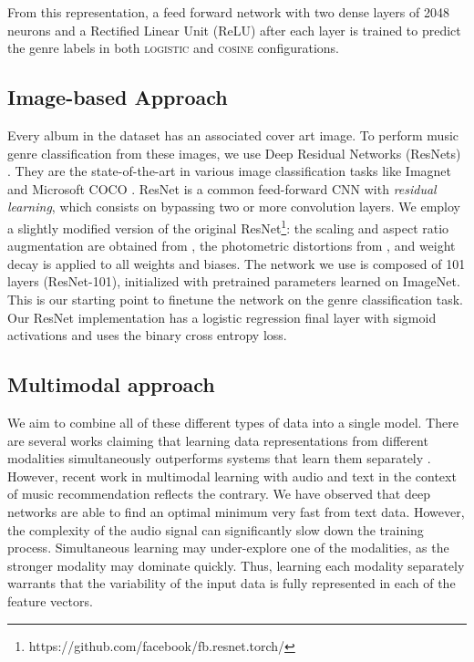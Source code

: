 \documentclass{article}
\begin{document}
From this representation, a feed forward network with two dense layers of 2048 neurons and a Rectified Linear Unit (ReLU) after each layer is trained to predict the genre labels in both \textsc{logistic} and \textsc{cosine} configurations. 



\subsection{Image-based Approach}
\label{sec:resnet}
Every album in the dataset has an associated cover art image. To perform music genre classification from these images, we use Deep Residual Networks (ResNets) \cite{he2016deep}.
They are the state-of-the-art in various image classification tasks like Imagnet \cite{ILSVRC15} and Microsoft COCO \cite{lin2014microsoft}. 
ResNet is a common feed-forward CNN with \emph{residual learning}, which consists on bypassing two or more convolution layers. We employ a slightly modified version of the original ResNet\footnote{https://github.com/facebook/fb.resnet.torch/}: the scaling and aspect ratio augmentation are obtained from \cite{szegedy2015going}, the photometric distortions from \cite{howard2013some}, and weight decay is applied to all weights and biases. The network we use is composed of 101 layers (ResNet-101), initialized with pretrained parameters learned on ImageNet.
This is our starting point to finetune the network on the genre classification task.
Our ResNet implementation has a logistic regression final layer with sigmoid activations and uses the binary cross entropy loss.


\subsection{Multimodal approach}\label{sec:multimodal}

We aim to combine all of these different types of data into a single model.
There are several works claiming that learning data representations from different modalities simultaneously outperforms systems that learn them separately \cite{ngiam2011multimodal,dorfer2016towards}. However, recent work in multimodal learning with audio and text in the context of music recommendation \cite{Oramas2017} reflects the contrary. We have observed that deep networks are able to find an optimal minimum very fast from text data. However, the complexity of the audio signal can significantly slow down the training process. Simultaneous learning may under-explore one of the modalities, as the stronger modality may dominate quickly. Thus, learning each modality separately warrants that the variability of the input data is fully represented in each of the feature vectors.
\end{document}
